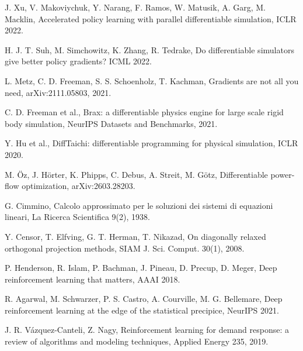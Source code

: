 \documentclass[11pt]{article}
\begin{document}
\begin{list}{}{\setlength{\leftmargin}{2.4em}\setlength{\labelwidth}{2.4em}\setlength{\itemsep}{2pt}\setlength{\parsep}{0pt}}
\item[\rrow{shac}] J. Xu, V. Makoviychuk, Y. Narang, F. Ramos, W. Matusik, A. Garg, M. Macklin, Accelerated policy learning with parallel differentiable simulation, ICLR 2022.
\item[\rrow{suh}] H. J. T. Suh, M. Simchowitz, K. Zhang, R. Tedrake, Do differentiable simulators give better policy gradients? ICML 2022.
\item[\rrow{metz}] L. Metz, C. D. Freeman, S. S. Schoenholz, T. Kachman, Gradients are not all you need, arXiv:2111.05803, 2021.
\item[\rrow{brax}] C. D. Freeman et al., Brax: a differentiable physics engine for large scale rigid body simulation, NeurIPS Datasets and Benchmarks, 2021.
\item[\rrow{difftaichi}] Y. Hu et al., DiffTaichi: differentiable programming for physical simulation, ICLR 2020.
\item[\rrow{dpf}] M. \"Oz, J. H\"orter, K. Phipps, C. Debus, A. Streit, M. G\"otz, Differentiable power-flow optimization, arXiv:2603.28203.
\item[\rrow{cimmino}] G. Cimmino, Calcolo approssimato per le soluzioni dei sistemi di equazioni lineari, La Ricerca Scientifica 9(2), 1938.
\item[\rrow{censor}] Y. Censor, T. Elfving, G. T. Herman, T. Nikazad, On diagonally relaxed orthogonal projection methods, SIAM J. Sci. Comput. 30(1), 2008.
\item[\rrow{henderson}] P. Henderson, R. Islam, P. Bachman, J. Pineau, D. Precup, D. Meger, Deep reinforcement learning that matters, AAAI 2018.
\item[\rrow{agarwal}] R. Agarwal, M. Schwarzer, P. S. Castro, A. Courville, M. G. Bellemare, Deep reinforcement learning at the edge of the statistical precipice, NeurIPS 2021.
\item[\rrow{vazquez}] J. R. V\'azquez-Canteli, Z. Nagy, Reinforcement learning for demand response: a review of algorithms and modeling techniques, Applied Energy 235, 2019.
\end{list}
\end{document}

